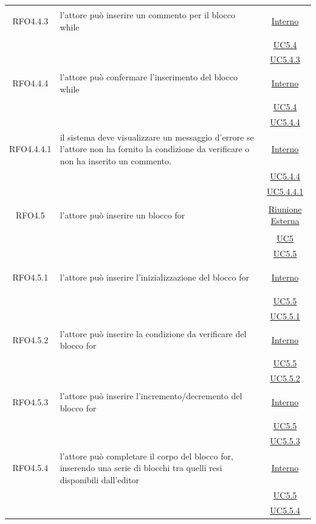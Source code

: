 \begin{longtable}{|c|>{\centering}m{7cm}|c|}
\hypertarget{RFO4.4.3}{RFO4.4.3} & l'attore può inserire un commento per il blocco while & \hyperlink{Interno}{Interno}\\
& &\hyperref[UC5.4]{UC5.4}\\
& &\hyperref[UC5.4.3]{UC5.4.3}\\ \hline

\hypertarget{RFO4.4.4}{RFO4.4.4} & l'attore può confermare l'inserimento del blocco while & \hyperlink{Interno}{Interno}\\
& &\hyperref[UC5.4]{UC5.4}\\
& &\hyperref[UC5.4.4]{UC5.4.4}\\ \hline

\hypertarget{RFO4.4.4.1}{RFO4.4.4.1} & il sistema deve visualizzare un messaggio d'errore se l'attore non ha fornito la condizione da verificare o non ha inserito un commento. &\hyperlink{Interno}{Interno}\\
& &\hyperref[UC5.4.4]{UC5.4.4}\\
& &\hyperref[UC5.4.4.1]{UC5.4.4.1}\\ \hline

\hypertarget{RFO4.5}{RFO4.5} & l'attore può inserire un blocco for &  \hyperlink{Riunione Esterna}{Riunione Esterna}\\
& &\hyperref[UC5]{UC5}\\
& &\hyperref[UC5.5]{UC5.5}\\ \hline

\hypertarget{RFO4.5.1}{RFO4.5.1} & l'attore può inserire l'inizializzazione del blocco for & \hyperlink{Interno}{Interno}\\
& &\hyperref[UC5.5]{UC5.5}\\
& &\hyperref[UC5.5.1]{UC5.5.1}\\ \hline

\hypertarget{RFO4.5.2}{RFO4.5.2} & l'attore può inserire la condizione da verificare del blocco for & \hyperlink{Interno}{Interno}\\
& &\hyperref[UC5.5]{UC5.5}\\
& &\hyperref[UC5.5.2]{UC5.5.2}\\ \hline

\hypertarget{RFO4.5.3}{RFO4.5.3} & l'attore può inserire l'incremento/decremento del blocco for & \hyperlink{Interno}{Interno}\\
& &\hyperref[UC5.5]{UC5.5}\\
& &\hyperref[UC5.5.3]{UC5.5.3}\\ \hline

\hypertarget{RFO4.5.4}{RFO4.5.4} & l'attore può completare il corpo del blocco for, inserendo una serie di blocchi tra quelli resi disponibili dall'editor  &\hyperlink{Interno}{Interno}\\
& &\hyperref[UC5.5]{UC5.5}\\
& &\hyperref[UC5.5.4]{UC5.5.4}\\ \hline


\end{longtable}
